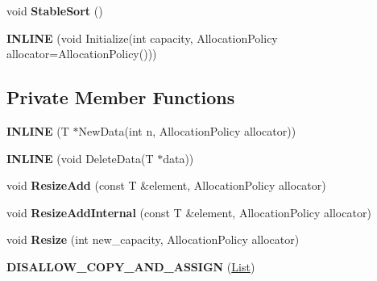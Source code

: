 \begin{DoxyCompactItemize}
\item 
void {\bfseries Stable\+Sort} ()\hypertarget{classv8_1_1internal_1_1_list_a130ddbd7b890f50fad7d1a60b308efd9}{}\label{classv8_1_1internal_1_1_list_a130ddbd7b890f50fad7d1a60b308efd9}

\item 
{\bfseries I\+N\+L\+I\+NE} (void Initialize(int capacity,                                                                                           Allocation\+Policy allocator=Allocation\+Policy()))\hypertarget{classv8_1_1internal_1_1_list_a0bf75a0550a81bb8caafefaf26643a7d}{}\label{classv8_1_1internal_1_1_list_a0bf75a0550a81bb8caafefaf26643a7d}

\end{DoxyCompactItemize}
\subsection*{Private Member Functions}
\begin{DoxyCompactItemize}
\item 
{\bfseries I\+N\+L\+I\+NE} (T $\ast$New\+Data(int n, Allocation\+Policy allocator))\hypertarget{classv8_1_1internal_1_1_list_ab253c580863fab55feaf3a975eeb25ac}{}\label{classv8_1_1internal_1_1_list_ab253c580863fab55feaf3a975eeb25ac}

\item 
{\bfseries I\+N\+L\+I\+NE} (void Delete\+Data(T $\ast$data))\hypertarget{classv8_1_1internal_1_1_list_a1daeef82cde6bab797a32422c79a3165}{}\label{classv8_1_1internal_1_1_list_a1daeef82cde6bab797a32422c79a3165}

\item 
void {\bfseries Resize\+Add} (const T \&element, Allocation\+Policy allocator)\hypertarget{classv8_1_1internal_1_1_list_aa2090a27348b8541f745101295916b3c}{}\label{classv8_1_1internal_1_1_list_aa2090a27348b8541f745101295916b3c}

\item 
void {\bfseries Resize\+Add\+Internal} (const T \&element, Allocation\+Policy allocator)\hypertarget{classv8_1_1internal_1_1_list_ac67ae01879fb5448b6d4e941de028391}{}\label{classv8_1_1internal_1_1_list_ac67ae01879fb5448b6d4e941de028391}

\item 
void {\bfseries Resize} (int new\+\_\+capacity, Allocation\+Policy allocator)\hypertarget{classv8_1_1internal_1_1_list_a88852ba0f60936cea90ad6b48f527bf0}{}\label{classv8_1_1internal_1_1_list_a88852ba0f60936cea90ad6b48f527bf0}

\item 
{\bfseries D\+I\+S\+A\+L\+L\+O\+W\+\_\+\+C\+O\+P\+Y\+\_\+\+A\+N\+D\+\_\+\+A\+S\+S\+I\+GN} (\hyperlink{classv8_1_1internal_1_1_list}{List})\hypertarget{classv8_1_1internal_1_1_list_a1cb4ec05b21520e3f3860bdb4bbf3481}{}\label{classv8_1_1internal_1_1_list_a1cb4ec05b21520e3f3860bdb4bbf3481}

\end{DoxyCompactItemize}
